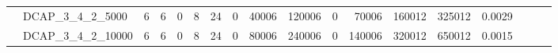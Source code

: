 \begin{table}[H]
{\begin{tabular}{llrrrrrrrrrrrrrlll}
			& DCAP\_3\_4\_2\_5000          & 6            & 6           & 0          & 8            & 24          & 0          & 40006   & 120006   & 0      & 70006   & 160012   & 325012     & 0.0029    &                          &                          &                          \\
			& DCAP\_3\_4\_2\_10000         & 6            & 6           & 0          & 8            & 24          & 0          & 80006   & 240006   & 0      & 140006  & 320012   & 650012     & 0.0015    &                          &                          &                          \\ \hline
		\end{tabular}%
	}
\end{table}
